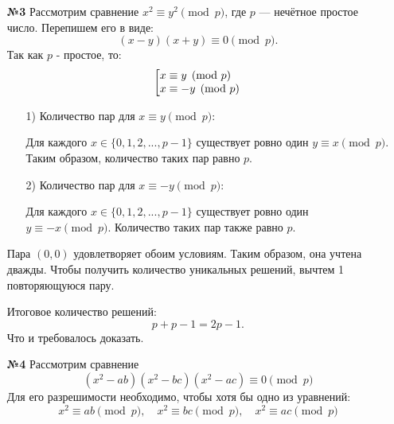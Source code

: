 \documentclass[a4paper]{article}
\makeatletter
\newcommand{\gath}[1]{\left[ \begin{array}{@{}l@{}} #1 \end{array} \right.}
\makeatother
\begin{document}
\begin{enumerate}
    Количество решений равно произведению количеств решений по каждому 
    простому множителю:
    \begin{enumerate}
        \item[1)]Для \(2^{76}\):
        
        Уравнение \(x^2 \equiv 25 \pmod{2^{76}}\). Так как \(25 \equiv 1 \pmod{8}\), 
        количество решений — 4.
        \item[2)]Для \(19^{91}\), \(7^{16}\), \(13^{16}\): 

        Уравнение \(x^2 \equiv 25 \pmod{p^k}\) имеет два решения 
        (\(x \equiv 5\) и \(x \equiv -5 \pmod{p^k}\)), так как \(5 \not\equiv -5 \pmod{p^k}\)
    \end{enumerate}
    Итоговое количество решений:  
    \[
    4 \cdot 2 \cdot 2 \cdot 2 = 32
    \]
    \textbf{Ответ: } $32$

    \item[\textbf{№3}]Рассмотрим сравнение \( x^2 \equiv y^2 \pmod{p} \), где \( p \)
     — нечётное простое число. Перепишем его в виде:
    \[
    (x - y)(x + y) \equiv 0 \pmod{p}.
    \]
    Так как $p$ - простое, то:
    $$\gath{ 
        x \equiv y \pmod{p} \\
        x \equiv -y \pmod{p} 
    }$$
    \begin{enumerate}
        \item[1)]Количество пар для \( x \equiv y \pmod{p}\):
    
        Для каждого \( x \in \{0, 1, 2, ..., p-1\} \) существует ровно один 
        \( y \equiv x \pmod{p} \). Таким образом, количество таких пар равно \( p \).
    
        \item[2)]Количество пар для \( x \equiv -y \pmod{p}\): 
    
        Для каждого \( x \in \{0, 1, 2, ..., p-1\} \) существует ровно один 
        \( y \equiv -x \pmod{p} \). Количество таких пар также равно \( p \).
    \end{enumerate}

    Пара \( (0, 0) \) удовлетворяет обоим условиям. Таким образом, она учтена дважды.
    Чтобы получить количество уникальных решений, вычтем 1 повторяющуюся пару.

    Итоговое количество решений:
    \[
    p + p - 1 = 2p - 1.
    \]
    Что и требовалось доказать.

    \item[\textbf{№4}]Рассмотрим сравнение 
    \[(x^2 - ab)(x^2 - bc)(x^2 - ac) \equiv 0 \pmod{p}\]
    Для его разрешимости необходимо, чтобы хотя бы одно из уравнений:
    \[x^2 \equiv ab \pmod{p}, \quad x^2 \equiv bc \pmod{p},
     \quad x^2 \equiv ac \pmod{p}\]


\end{enumerate}
\end{document}
